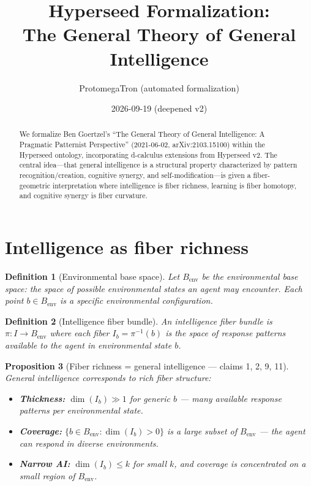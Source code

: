 \documentclass[11pt,a4paper]{article}
\title{Hyperseed Formalization:\\
  The General Theory of General Intelligence}
\author{ProtomegaTron (automated formalization)}
\date{2026-09-19 (deepened v2)}
\newtheorem{definition}{Definition}[section]
\newtheorem{proposition}[definition]{Proposition}
\begin{document}
\maketitle

\begin{abstract}
We formalize Ben Goertzel's ``The General Theory of General Intelligence:
A Pragmatic Patternist Perspective'' (2021-06-02, arXiv:2103.15100) within the
Hyperseed ontology, incorporating d-calculus extensions from Hyperseed v2. The
central idea---that general intelligence is a structural property characterized
by pattern recognition/creation, cognitive synergy, and self-modification---is
given a fiber-geometric interpretation where intelligence is fiber richness,
learning is fiber homotopy, and cognitive synergy is fiber curvature.
\end{abstract}

\tableofcontents

\section{Intelligence as fiber richness}

\begin{definition}[Environmental base space]
Let $B_{\text{env}}$ be the \emph{environmental base space}: the space of
possible environmental states an agent may encounter. Each point
$b \in B_{\text{env}}$ is a specific environmental configuration.
\end{definition}

\begin{definition}[Intelligence fiber bundle]
An \emph{intelligence fiber bundle} is $\pi : I \to B_{\text{env}}$ where
each fiber $I_b = \pi^{-1}(b)$ is the space of response patterns
available to the agent in environmental state $b$.
\end{definition}

\begin{proposition}[Fiber richness = general intelligence --- claims 1, 2, 9, 11]
\label{prop:richness}
General intelligence corresponds to rich fiber structure:
\begin{itemize}
  \item \textbf{Thickness:} $\dim(I_b) \gg 1$ for generic $b$ --- many
    available response patterns per environmental state.
  \item \textbf{Coverage:} $\{b \in B_{\text{env}} : \dim(I_b) > 0\}$ is
    a large subset of $B_{\text{env}}$ --- the agent can respond in
    diverse environments.
  \item \textbf{Narrow AI:} $\dim(I_b) \leq k$ for small $k$, and coverage
    is concentrated on a small region of $B_{\text{env}}$.
\end{itemize}
\end{proposition}
\end{document}
